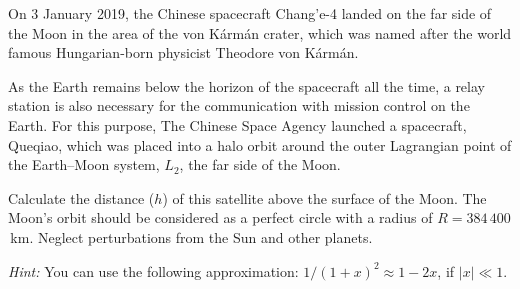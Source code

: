 On 3 January 2019, the Chinese spacecraft Chang'e-4 landed on the far side of
the Moon in the area of the von K\'arm\'an crater, which was named after the
world famous Hungarian-born physicist Theodore von K\'arm\'an.

As the Earth remains below the horizon of the spacecraft all the time, a relay
station is also necessary for the communication with mission control on the
Earth. For this purpose, The Chinese Space Agency launched a spacecraft,
Queqiao, which was placed into a halo orbit around the outer Lagrangian point
of the Earth--Moon system, $L_2$, the far side of the Moon.

Calculate the distance ($h$) of this satellite above the surface of the Moon.
The Moon's orbit should be considered as a perfect circle with a radius of
$R = 384\,400$\,km. Neglect perturbations from the Sun and other planets.

\emph{Hint:} You can use the following approximation:
$1/(1+x)^2 \approx 1 - 2x$, if $|x| \ll 1$.

